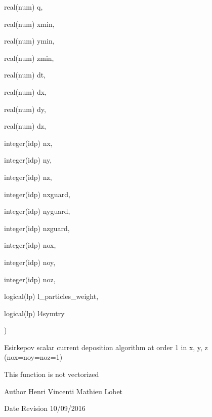 {\begin{DoxyParamCaption}
\item[{real(num)}]{q, }
\item[{real(num)}]{xmin, }
\item[{real(num)}]{ymin, }
\item[{real(num)}]{zmin, }
\item[{real(num)}]{dt, }
\item[{real(num)}]{dx, }
\item[{real(num)}]{dy, }
\item[{real(num)}]{dz, }
\item[{integer(idp)}]{nx, }
\item[{integer(idp)}]{ny, }
\item[{integer(idp)}]{nz, }
\item[{integer(idp)}]{nxguard, }
\item[{integer(idp)}]{nyguard, }
\item[{integer(idp)}]{nzguard, }
\item[{integer(idp)}]{nox, }
\item[{integer(idp)}]{noy, }
\item[{integer(idp)}]{noz, }
\item[{logical(lp)}]{l\+\_\+particles\+\_\+weight, }
\item[{logical(lp)}]{l4symtry}
\end{DoxyParamCaption}
)}\hypertarget{current__deposition_8_f90_ad43ded0ebf597e9d3cb47ff84ec04413}{}\label{current__deposition_8_f90_ad43ded0ebf597e9d3cb47ff84ec04413}


Esirkepov scalar current deposition algorithm at order 1 in x, y, z (nox=noy=noz=1) 

This function is not vectorized

\begin{DoxyAuthor}{Author}
Henri Vincenti Mathieu Lobet
\end{DoxyAuthor}
\begin{DoxyDate}{Date}
Revision 10/09/2016
\end{DoxyDate}

